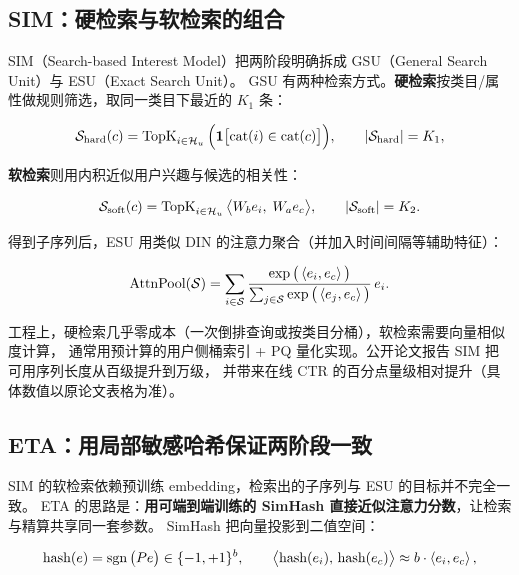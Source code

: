 \subsection{SIM：硬检索与软检索的组合}

SIM（Search-based Interest Model）把两阶段明确拆成 GSU（General Search Unit）与 ESU（Exact Search Unit）。
GSU 有两种检索方式。\textbf{硬检索}按类目/属性做规则筛选，取同一类目下最近的 $K_1$ 条：

\begin{equation}
\mathcal{S}_{\text{hard}}(c) = \operatorname{TopK}_{i \in \mathcal{H}_u}
\Big( \mathbf{1}\big[ \text{cat}(i) \in \text{cat}(c) \big] \Big),
\qquad \left\lvert \mathcal{S}_{\text{hard}} \right\rvert = K_1 ,
\label{eq:sim-hard}
\end{equation}

\textbf{软检索}则用内积近似用户兴趣与候选的相关性：

\begin{equation}
\mathcal{S}_{\text{soft}}(c) = \operatorname{TopK}_{i \in \mathcal{H}_u}
\big\langle W_b e_i,\; W_a e_c \big\rangle ,
\qquad \left\lvert \mathcal{S}_{\text{soft}} \right\rvert = K_2 .
\label{eq:sim-soft}
\end{equation}

得到子序列后，ESU 用类似 DIN 的注意力聚合（并加入时间间隔等辅助特征）：

\begin{equation}
\text{AttnPool}(\mathcal{S}) = \sum_{i \in \mathcal{S}}
\frac{ \exp\big( \left\langle  e_i ,  e_c  \right\rangle \big) }
     { \sum_{j \in \mathcal{S}} \exp\big( \left\langle  e_j ,  e_c  \right\rangle \big) } \, e_i .
\label{eq:esu}
\end{equation}

工程上，硬检索几乎零成本（一次倒排查询或按类目分桶），软检索需要向量相似度计算，
通常用预计算的用户侧桶索引 + PQ 量化实现。公开论文报告 SIM 把可用序列长度从百级提升到万级，
并带来在线 CTR 的百分点量级相对提升（具体数值以原论文表格为准）。

\subsection{ETA：用局部敏感哈希保证两阶段一致}

SIM 的软检索依赖预训练 embedding，检索出的子序列与 ESU 的目标并不完全一致。
ETA 的思路是：\textbf{用可端到端训练的 SimHash 直接近似注意力分数}，让检索与精算共享同一套参数。
SimHash 把向量投影到二值空间：

\begin{equation}
\text{hash}(e) = \operatorname{sgn}\big( P e \big) \in \{-1, +1\}^{b},
\qquad
\big\langle \text{hash}(e_i),\, \text{hash}(e_c) \big\rangle \approx b \cdot \left\langle  e_i ,  e_c  \right\rangle ,
\label{eq:eta-hash}
\end{equation}

